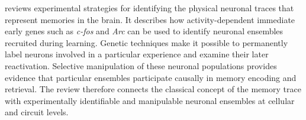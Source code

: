 \documentclass[a4paper]{article}
\begin{document}
      \cite{sakaguchi-2012-catching-the-engram-strategies-to-examine-the-memory-trace} reviews experimental strategies for identifying the physical neuronal traces that represent memories in the brain. It describes how activity-dependent immediate early genes such as \textit{c-fos} and \textit{Arc} can be used to identify neuronal ensembles recruited during learning. Genetic techniques make it possible to permanently label neurons involved in a particular experience and examine their later reactivation.
      Selective manipulation of these neuronal populations provides evidence that particular ensembles participate causally in memory encoding and retrieval. The review therefore connects the classical concept of the memory trace with experimentally identifiable and manipulable neuronal ensembles at cellular and circuit levels.
      
      
      

      
      
\end{document}
